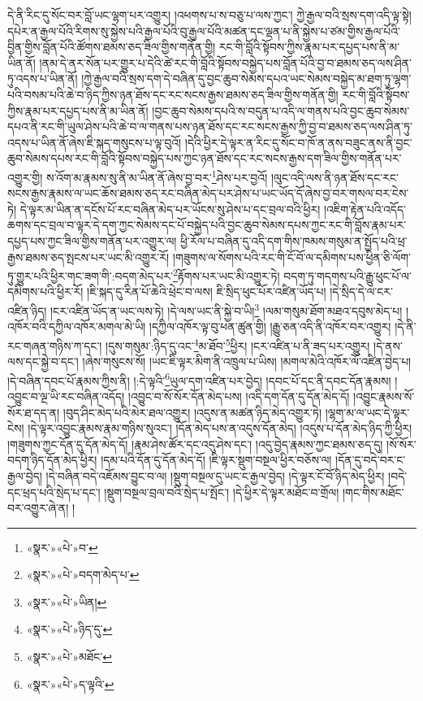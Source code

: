 དེ་ནི་རིང་དུ་སོང་བར་བློ་ཡང་ལྷག་པར་འགྱུར། །འཕགས་པ་ས་བཅུ་པ་ལས་ཀྱང་། ཀྱེ་རྒྱལ་བའི་སྲས་དག་འདི་ལྟ་སྟེ། དཔེར་ན་རྒྱལ་པོའི་རིགས་སུ་སྐྱེས་པའི་རྒྱལ་པོའི་བུ་རྒྱལ་པོའི་མཚན་དང་ལྡན་པ་ནི་སྐྱེས་པ་ཙམ་གྱིས་རྒྱལ་པོའི་བྱིན་གྱིས་བློན་པོའི་ཚོགས་ཐམས་ཅད་ཟིལ་གྱིས་གནོན་གྱི། རང་གི་བློའི་སྟོབས་ཀྱིས་རྣམ་པར་དཔྱད་པས་ནི་མ་ཡིན་ནོ། །ནམ་དེ་ནར་སོན་པར་གྱུར་པ་དེའི་ཚེ་རང་གི་བློའི་སྟོབས་བསྐྱེད་པས་བློན་པོའི་བྱ་བ་ཐམས་ཅད་ལས་ཤིན་ཏུ་འདས་པ་ཡིན་ནོ། །ཀྱེ་རྒྱལ་བའི་སྲས་དག་དེ་བཞིན་དུ་བྱང་ཆུབ་སེམས་དཔའ་ཡང་སེམས་བསྐྱེད་མ་ཐག་ཏུ་ལྷག་པའི་བསམ་པའི་ཆེ་བ་ཉིད་ཀྱིས་ཉན་ཐོས་དང་རང་སངས་རྒྱས་ཐམས་ཅད་ཟིལ་གྱིས་གནོན་གྱི། རང་གི་བློའི་སྟོབས་ཀྱིས་རྣམ་པར་དཔྱད་པས་ནི་མ་ཡིན་ནོ། །བྱང་ཆུབ་སེམས་དཔའི་ས་བདུན་པ་འདི་ལ་གནས་པའི་བྱང་ཆུབ་སེམས་དཔའ་ནི་རང་གི་ཡུལ་ཤེས་པའི་ཆེ་བ་ལ་གནས་པས་ཉན་ཐོས་དང་རང་སངས་རྒྱས་ཀྱི་བྱ་བ་ཐམས་ཅད་ལས་ཤིན་ཏུ་འདས་པ་ཡིན་ནོ་ཞེས་ཇི་སྐད་གསུངས་པ་ལྟ་བུའོ། །དེའི་ཕྱིར་དེ་ལྟར་ན་རིང་དུ་སོང་བ་ཁོ་ན་ནས་བཟུང་ནས་ནི་བྱང་ཆུབ་སེམས་དཔས་རང་གི་བློའི་སྟོབས་བསྐྱེད་པས་ཀྱང་ཉན་ཐོས་དང་རང་སངས་རྒྱས་དག་ཟིལ་གྱིས་གནོན་པར་འགྱུར་གྱི། ས་འོག་མ་རྣམས་སུ་ནི་མ་ཡིན་ནོ་ཞེས་བྱ་བར་\footnote{«སྣར་»«པེ་»བ་}ཤེས་པར་བྱའོ། །ལུང་འདི་ལས་ནི་ཉན་ཐོས་དང་རང་སངས་རྒྱས་རྣམས་ལ་ཡང་ཆོས་ཐམས་ཅད་རང་བཞིན་མེད་པར་ཤེས་པ་ཡང་ཡོད་དོ་ཞེས་བྱ་བར་གསལ་བར་ངེས་ཏེ། དེ་ལྟར་མ་ཡིན་ན་དངོས་པོ་རང་བཞིན་མེད་པར་ཡོངས་སུ་ཤེས་པ་དང་བྲལ་བའི་ཕྱིར། །འཇིག་རྟེན་པའི་འདོད་ཆགས་དང་བྲལ་བ་ལྟར་དེ་དག་ཀྱང་སེམས་དང་པོ་བསྐྱེད་པའི་བྱང་ཆུབ་སེམས་དཔས་ཀྱང་རང་གི་བློས་རྣམ་པར་དཔྱད་པས་ཀྱང་ཟིལ་གྱིས་གནོན་པར་འགྱུར་ལ། ཕྱི་རོལ་པ་བཞིན་དུ་འདི་དག་གིས་ཁམས་གསུམ་ན་སྤྱོད་པའི་ཕྲ་རྒྱས་ཐམས་ཅད་སྤངས་པར་ཡང་མི་འགྱུར་རོ། །གཟུགས་ལ་སོགས་པའི་རང་གི་ངོ་བོ་ལ་དམིགས་པས་ཕྱིན་ཅི་ལོག་ཏུ་གྱུར་པའི་ཕྱིར་གང་ཟག་གི་:བདག་མེད་པར་\footnote{«སྣར་»«པེ་»བདག་མེད་པ་}རྟོགས་པར་ཡང་མི་འགྱུར་ཏེ། བདག་ཏུ་གདགས་པའི་རྒྱུ་ཕུང་པོ་ལ་དམིགས་པའི་ཕྱིར་རོ། །ཇི་སྐད་དུ་རིན་པོ་ཆེའི་ཕྲེང་བ་ལས། ཇི་སྲིད་ཕུང་པོར་འཛིན་ཡོད་པ། །དེ་སྲིད་དེ་ལ་ངར་འཛིན་ཉིད། །ངར་འཛིན་ཡོད་ན་ཡང་ལས་ཏེ། །དེ་ལས་ཡང་ནི་སྐྱེ་བ་ཡི།\footnote{«སྣར་»«པེ་»ཡིན།} །ལམ་གསུམ་ཐོག་མཐའ་དབུས་མེད་པ། །འཁོར་བའི་དཀྱིལ་འཁོར་མགལ་མེ་ཡི། །དཀྱིལ་འཁོར་ལྟ་བུ་ཕན་ཚུན་གྱི། །རྒྱུ་ཅན་འདི་ནི་འཁོར་བར་འགྱུར། །དེ་ནི་རང་གཞན་གཉིས་ཀ་དང་། །དུས་གསུམ་:ཉིད་དུ་འང་\footnote{«སྣར་»«པེ་»ཉིད་དུ་}མ་ཐོབ་\footnote{«སྣར་»«པེ་»མཐོང་}ཕྱིར། །ངར་འཛིན་པ་ནི་ཟད་པར་འགྱུར། །དེ་ནས་ལས་དང་སྐྱེ་བ་དང་། །ཞེས་གསུངས་སོ། །ཡང་ཇི་ལྟར་མིག་ནི་འཁྲུལ་པ་ཡིས། །མགལ་མེའི་འཁོར་ལོ་འཛིན་བྱེད་པ། །དེ་བཞིན་དབང་པོ་རྣམས་ཀྱིས་ནི། །:དེ་ལྟའི་\footnote{«སྣར་»«པེ་»ད་ལྟའི་}ཡུལ་དག་འཛིན་པར་བྱེད། །དབང་པོ་དང་ནི་དབང་དོན་རྣམས། །འབྱུང་བ་ལྔ་ཡི་རང་བཞིན་འདོད། །འབྱུང་བ་སོ་སོར་དོན་མེད་པས། །འདི་དག་དོན་དུ་དོན་མེད་དོ། །འབྱུང་རྣམས་སོ་སོར་ཐ་དད་ན། །བུད་ཤིང་མེད་པའི་མེར་ཐལ་འགྱུར། །འདུས་ན་མཚན་ཉིད་མེད་འགྱུར་ཏེ། །ལྷག་མ་ལ་ཡང་དེ་ལྟར་ངེས། །དེ་ལྟར་འབྱུང་རྣམས་རྣམ་གཉིས་སུའང་། །དོན་མེད་པས་ན་འདུས་དོན་མེད། །འདུས་པ་དོན་མེད་ཉིད་ཀྱི་ཕྱིར། །གཟུགས་ཀྱང་དོན་དུ་དོན་མེད་དོ། །རྣམ་ཤེས་ཚོར་དང་འདུ་ཤེས་དང་། །འདུ་བྱེད་རྣམས་ཀྱང་ཐམས་ཅད་དུ། །སོ་སོར་བདག་ཉིད་དོན་མེད་ཕྱིར། །དམ་པའི་དོན་དུ་དོན་མེད་དོ། །ཇི་ལྟར་སྡུག་བསྔལ་ཕྱིར་བཅོས་ལ། །དོན་དུ་བདེ་བར་ང་རྒྱལ་བྱེད། །དེ་བཞིན་བདེ་འཇོམས་བྱུང་བ་ལ། །སྡུག་བསྔལ་དུ་ཡང་ང་རྒྱལ་བྱེད། །དེ་ལྟར་ངོ་བོ་ཉིད་མེད་ཕྱིར། །བདེ་དང་ཕྲད་པའི་སྲེད་པ་དང་། །སྡུག་བསྔལ་བྲལ་བའི་སྲེད་པ་སྤོང་། །དེ་ཕྱིར་དེ་ལྟར་མཐོང་བ་གྲོལ། །གང་གིས་མཐོང་བར་འགྱུར་ཞེ་ན། །
